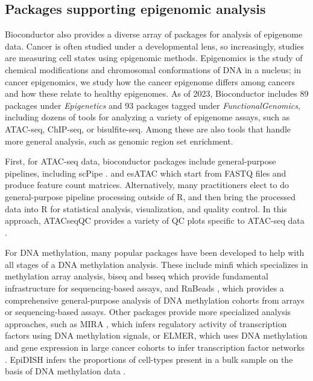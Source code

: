 \documentclass[graybox]{svmult}
\begin{document}
\subsection{Packages supporting epigenomic analysis}\label{packages-supporting-epigenomic-analysis}

Bioconductor also provides a diverse array of packages for analysis of epigenome
data. Cancer is often studied under a developmental lens, so increasingly, studies
are measuring cell states using epigenomic methods. Epigenomics is the study of
chemical modifications and chromosomal conformations of DNA in a nucleus; in cancer
epigenomics, we study how the cancer epigenome differs among cancers and how
these relate to healthy epigenomes. As of 2023, Bioconductor includes 89 packages
under \emph{Epigenetics} and 93 packages tagged under \emph{FunctionalGenomics}, including dozens of tools
for analyzing a variety of epigenome assays, such as ATAC-seq, ChIP-seq, or
bisulfite-seq. Among these are also tools that handle more general analysis, such
as genomic region set enrichment.

First, for ATAC-seq data, bioconductor packages include general-purpose pipelines, including scPipe
\cite{Tian2018}. %
and esATAC \cite{Wei2018} %
which start from FASTQ files and produce feature count
matrices. Alternatively, many practitioners elect to do general-purpose pipeline processing outside of
R, and then bring the processed data into R for statistical analysis,
visualization, and quality control. In this approach, ATACseqQC
provides
a variety of QC plots specific to ATAC-seq data \cite{Ou2018}.%

For DNA methylation, many popular packages have been developed to help with
all stages of a DNA methylation analysis. These include minfi 
\cite{Aryee2014}
which specializes in methylation array analysis, biseq and bsseq \cite{Hansen2012}  %
which provide fundamental infrastructure for sequencing-based assays, and RnBeads
\cite{Mueller2019},
which provides a comprehensive general-purpose analysis of DNA
methylation cohorts from arrays or sequencing-based assays. Other packages provide more specialized
analysis approaches, such as MIRA \cite{Lawson2018}, %
which infers regulatory
activity of transcription factors using DNA methylation signals, %
or ELMER, which uses DNA methylation and gene expression in large cancer
cohorts to infer transcription factor networks \cite{Silva2019}. %
EpiDISH infers
the proportions of cell-types present in a bulk sample on the basis
of DNA methylation data \cite{Zheng2018a}. %
\end{document}
